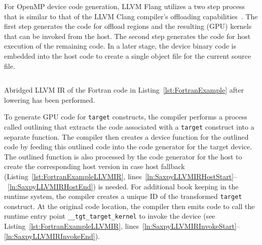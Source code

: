 \documentclass[acmtog,natbib=false]{acmart}
\newcommand{\code}[1]{\texttt{#1}\xspace}
\begin{document}
For OpenMP device code generation, LLVM Flang utilizes a two step process that is similar to that of the LLVM Clang compiler's offloading capabilities~\cite{antao2016offloading}. 
The first step generates the code for offload regions and the resulting (GPU) kernels that can be invoked from the host.
The second step generates the code for host execution of the remaining code.
In a later stage, the device binary code is embedded into the host code to create a single object file for the current source file.
 

\begin{listing}[t]
\inputminted{MLIR-lexer.py:MlirLexer -x}{code/tgt_loop_abridged.ll}
\caption{Abridged LLVM \ac{IR} of the Fortran code in Listing~\ref{lst:FortranExample} after lowering has been performed.}
\label{lst:FortranExampleLLVMIR}
\end{listing}

To generate GPU code for \code{target} constructs, the compiler performs a process called outlining that extracts the code associated with a \code{target} construct into a separate function.
The compiler then creates a device function for the outlined code by feeding this outlined code into the code generator for the target device. 
The outlined function is also processed by the code generator for the host to create the corresponding host version in case host fallback (Listing~\ref{lst:FortranExampleLLVMIR}, lines~\ref{ln:SaxpyLLVMIRHostStart}--~\ref{ln:SaxpyLLVMIRHostEnd}) is needed.
For additional book keeping in the runtime system, the compiler creates a unique ID of the transformed \code{target} construct.
At the original code location, the compiler then emits code to call the runtime entry point \code{\_\_tgt\_target\_kernel} to invoke the device (see Listing~\ref{lst:FortranExampleLLVMIR}, lines~\ref{ln:SaxpyLLVMIRInvokeStart}--\ref{ln:SaxpyLLVMIRInvokeEnd}).

\end{document}
